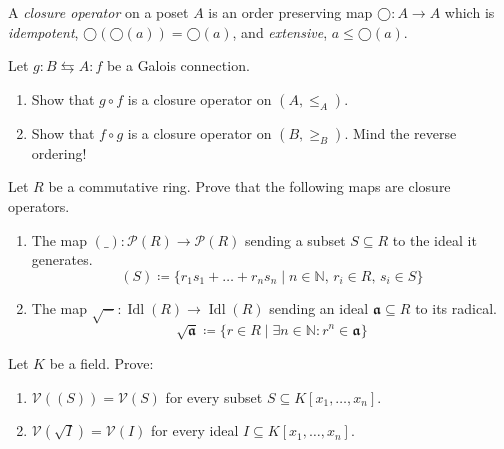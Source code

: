 \documentclass{exercises}
\DeclareMathOperator{\Idl}{Idl}
\begin{document}
\begin{exercise}
  A \emph{closure operator} on a poset $A$ is an order preserving map $◯:A → A$ which is \emph{idempotent}, $◯(◯(a)) = ◯(a)$, and \emph{extensive}, $a ≤ ◯(a)$.

  Let $g:B ⇆ A:f$ be a Galois connection.
  \begin{enumerate}
    \item Show that $g∘f$ is a closure operator on $(A,≤_A)$.
    \item Show that $f∘g$ is a closure operator on $(B,≥_B)$.
      {\scriptsize Mind the reverse ordering!}
  \end{enumerate}
  Let $R$ be a commutative ring.
  Prove that the following maps are closure operators.
  \begin{enumerate}[start=3]
    \item The map $(\_):𝒫(R) → 𝒫(R)$ sending a subset $S⊆R$ to the ideal it generates. 
      $$
      (S)\coloneqq \{r_1s_1 + \dots + r_ns_n \mid n ∈ ℕ,\, r_i ∈ R,\, s_i ∈ S\}
      $$
    \item The map $\sqrt{-}:\Idl(R) → \Idl(R)$ sending an ideal $𝖆⊆R$ to its radical.
      $$
      \sqrt{𝖆}\coloneqq\{r ∈ R \mid ∃n ∈ ℕ : r^n ∈ 𝖆\}
      $$
  \end{enumerate}
  Let $K$ be a field.
  Prove:
  \begin{enumerate}[start=5]
    \item $𝒱((S))=𝒱(S)$ for every subset $S⊆K[x_1,\dots,x_n]$.
    \item $𝒱(\sqrt{I})=𝒱(I)$ for every ideal $I⊆K[x_1,\dots,x_n]$.
  \end{enumerate}
\end{exercise}
\end{document}
